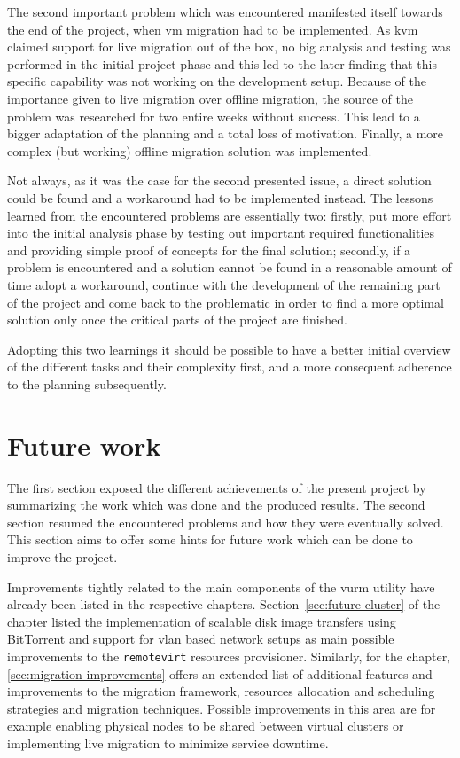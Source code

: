 The second important problem which was encountered manifested itself towards the end of the project, when \gls{vm} migration had to be implemented. As \gls{kvm} claimed support for live migration out of the box, no big analysis and testing was performed in the initial project phase and this led to the later finding that this specific capability was not working on the development setup. Because of the importance given to live migration over offline migration, the source of the problem was researched for two entire weeks without success. This lead to a bigger adaptation of the planning and a total loss of motivation. Finally, a more complex (but working) offline migration solution was implemented.

Not always, as it was the case for the second presented issue, a direct solution could be found and a workaround had to be implemented instead. The lessons learned from the encountered problems are essentially two: firstly, put more effort into the initial analysis phase by testing out important required functionalities and providing simple proof of concepts for the final solution; secondly, if a problem is encountered and a solution cannot be found in a reasonable amount of time adopt a workaround, continue with the development of the remaining part of the project and come back to the problematic in order to find a more optimal solution only once the critical parts of the project are finished.

Adopting this two learnings it should be possible to have a better initial overview of the different tasks and their complexity first, and a more consequent adherence to the planning subsequently.



\section{Future work}
\label{sec:future}

The first section exposed the different achievements of the present project by summarizing the work which was done and the produced results. The second section resumed the encountered problems and how they were eventually solved. This section aims to offer some hints for future work which can be done to improve the project.

Improvements tightly related to the main components of the \gls{vurm} utility have already been listed in the respective chapters. Section~\ref{sec:future-cluster} of the \emph{} chapter listed the implementation of scalable disk image transfers using BitTorrent and support for \gls{vlan} based network setups as main possible improvements to the \texttt{remotevirt} resources provisioner. Similarly, for the \emph{} chapter, \autoref{sec:migration-improvements} offers an extended list of additional features and improvements to the migration framework, resources allocation and scheduling strategies and migration techniques. Possible improvements in this area are for example enabling physical nodes to be shared between virtual clusters or implementing live migration to minimize service downtime.

